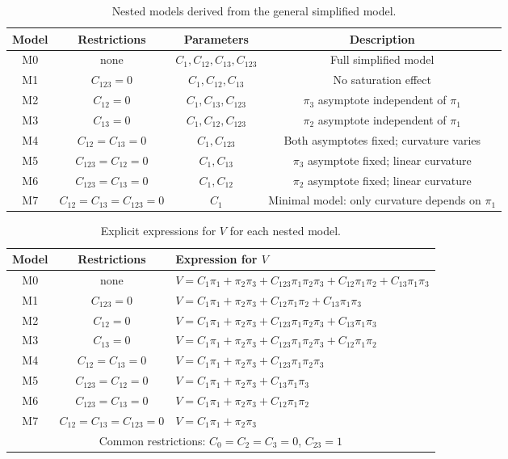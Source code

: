 \begin{table}[h]
\centering
\setlength{\tabcolsep}{2pt}
\renewcommand{\arraystretch}{1.3}
\caption{Nested models derived from the general simplified model.}
\label{tab:nested_models}
\begin{tabular}{@{}c c c c@{}}
\toprule
\textbf{Model} & \textbf{Restrictions} & \textbf{Parameters} & \textbf{Description} \\
\midrule
M0 & none & \(C_1, C_{12}, C_{13}, C_{123}\) & Full simplified model \\
M1 & \(C_{123}=0\) & \(C_1, C_{12}, C_{13}\) & No saturation effect \\
M2 & \(C_{12}=0\) & \(C_1, C_{13}, C_{123}\) & \(\pi_3\) asymptote independent of \(\pi_1\) \\
M3 & \(C_{13}=0\) & \(C_1, C_{12}, C_{123}\) & \(\pi_2\) asymptote independent of \(\pi_1\) \\
M4 & \(C_{12}=C_{13}=0\) & \(C_1, C_{123}\) & Both asymptotes fixed; curvature varies \\
M5 & \(C_{123}=C_{12}=0\) & \(C_1, C_{13}\) & \(\pi_3\) asymptote fixed; linear curvature \\
M6 & \(C_{123}=C_{13}=0\) & \(C_1, C_{12}\) & \(\pi_2\) asymptote fixed; linear curvature \\
M7 & \(C_{12}=C_{13}=C_{123}=0\) & \(C_1\) & Minimal model: only curvature depends on \(\pi_1\) \\
\bottomrule
\end{tabular}
\end{table}

\begin{table}[h]
\centering
\setlength{\tabcolsep}{2pt}
\renewcommand{\arraystretch}{1.5}
\caption{Explicit expressions for \(V\) for each nested model.}
\label{tab:V_expressions}
\begin{tabular}{@{}ccl@{}}
\toprule
\textbf{Model} & \textbf{Restrictions} & \textbf{Expression for \(V\)} \\
\midrule
M0 & none & \(V = C_1\pi_1 + \pi_2\pi_3 + C_{123}\pi_1\pi_2\pi_3 + C_{12}\pi_1\pi_2 + C_{13}\pi_1\pi_3\) \\
M1 & \(C_{123}=0\) & \(V = C_1\pi_1 + \pi_2\pi_3 + C_{12}\pi_1\pi_2 + C_{13}\pi_1\pi_3\) \\
M2 & \(C_{12}=0\) & \(V = C_1\pi_1 + \pi_2\pi_3 + C_{123}\pi_1\pi_2\pi_3 + C_{13}\pi_1\pi_3\) \\
M3 & \(C_{13}=0\) & \(V = C_1\pi_1 + \pi_2\pi_3 + C_{123}\pi_1\pi_2\pi_3 + C_{12}\pi_1\pi_2\) \\
M4 & \(C_{12}=C_{13}=0\) & \(V = C_1\pi_1 + \pi_2\pi_3 + C_{123}\pi_1\pi_2\pi_3\) \\
M5 & \(C_{123}=C_{12}=0\) & \(V = C_1\pi_1 + \pi_2\pi_3 + C_{13}\pi_1\pi_3\) \\
M6 & \(C_{123}=C_{13}=0\) & \(V = C_1\pi_1 + \pi_2\pi_3 + C_{12}\pi_1\pi_2\) \\
M7 & \(C_{12}=C_{13}=C_{123}=0\) & \(V = C_1\pi_1 + \pi_2\pi_3\) \\
\midrule
\multicolumn{3}{c}{Common restrictions: \(C_0 = C_2 = C_3 = 0\), \(C_{23} = 1\)} \\
\bottomrule
\end{tabular}
\end{table}

